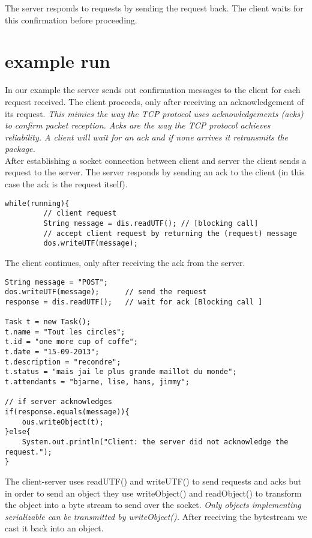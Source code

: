 The server responds to requests by sending the request back. The client waits for this confirmation before proceeding. 

\section{example run}
\label{tcp_example}

In our example the server sends out confirmation messages to the client for each request received. The client proceeds, only after receiving an acknowledgement of its request. \textit{This mimics the way the TCP protocol uses acknowledgements (acks) to confirm packet reception. Acks are the way the TCP protocol achieves \textit{reliability}. A client will wait for an ack and if none arrives it retransmits the package.}\\   

After establishing a socket connection between client and server the client sends a request to the server. The server responds by sending an ack to the client (in this case the ack is the request itself).
% 

\begin{lstlisting}[caption= server sends an ack to a request]
while(running){
         // client request
         String message = dis.readUTF(); // [blocking call]
         // accept client request by returning the (request) message
         dos.writeUTF(message);    

\end{lstlisting}

The client continues, only after receiving the ack from the server.
\begin{lstlisting}[caption=client request and wait for ack]
String message = "POST";
dos.writeUTF(message);		// send the request
response = dis.readUTF();	// wait for ack [Blocking call ]

Task t = new Task();
t.name = "Tout les circles";
t.id = "one more cup of coffe";
t.date = "15-09-2013";	
t.description = "recondre";
t.status = "mais jai le plus grande maillot du monde";
t.attendants = "bjarne, lise, hans, jimmy";

// if server acknowledges
if(response.equals(message)){
   	ous.writeObject(t);
}else{
   	System.out.println("Client: the server did not acknowledge the request.");
}
\end{lstlisting}

The client-server uses readUTF() and writeUTF() to send requests and acks but in order to send an object they use writeObject() and readObject() to transform the object into a byte stream to send over the socket. \textit{Only objects implementing serializable can be transmitted by writeObject().} After receiving the bytestream we cast it back into an object.\\

